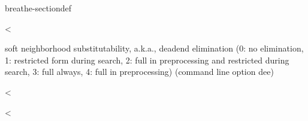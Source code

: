 \documentclass[letterpaper,10pt,openany,oneside,english]{sphinxmanual}
\begin{document}
\begin{fulllineitems}
\begin{sphinxuseclass}{breathe-sectiondef}
\begin{fulllineitems}
\label{\detokenize{ref/ref_cpp:_CPPv4N8ToulBar24DEE_E}}\label{\detokenize{ref/ref_cpp:_CPPv3N8ToulBar24DEE_E}}\label{\detokenize{ref/ref_cpp:_CPPv2N8ToulBar24DEE_E}}\label{\detokenize{ref/ref_cpp:ToulBar2::DEE___i}}
\pysigstartsignatures
\pysigstartmultiline
{}
\pysigstopmultiline
\pysigstopsignatures
\sphinxAtStartPar
\textless{} 

\sphinxAtStartPar
soft neighborhood substitutability, a.k.a., dead\sphinxhyphen{}end elimination (0: no elimination, 1: restricted form during search, 2: full in preprocessing and restricted during search, 3: full always, 4: full in preprocessing) (command line option \sphinxhyphen{}dee) 

\end{fulllineitems}


\begin{fulllineitems}
\label{\detokenize{ref/ref_cpp:_CPPv4N8ToulBar214nbDecisionVarsE}}\label{\detokenize{ref/ref_cpp:_CPPv3N8ToulBar214nbDecisionVarsE}}\label{\detokenize{ref/ref_cpp:_CPPv2N8ToulBar214nbDecisionVarsE}}\label{\detokenize{ref/ref_cpp:ToulBar2::nbDecisionVars__i}}
\pysigstartsignatures
\pysigstartmultiline
{}
\pysigstopmultiline
\pysigstopsignatures
\sphinxAtStartPar
\textless{} 

\end{fulllineitems}


\begin{fulllineitems}
\label{\detokenize{ref/ref_cpp:_CPPv4N8ToulBar23ldsE}}\label{\detokenize{ref/ref_cpp:_CPPv3N8ToulBar23ldsE}}\label{\detokenize{ref/ref_cpp:_CPPv2N8ToulBar23ldsE}}\label{\detokenize{ref/ref_cpp:ToulBar2::lds__i}}
\pysigstartsignatures
\pysigstartmultiline
{}
\pysigstopmultiline
\pysigstopsignatures
\sphinxAtStartPar
\textless{} 


\end{fulllineitems}
\end{sphinxuseclass}
\end{fulllineitems}
\end{document}
